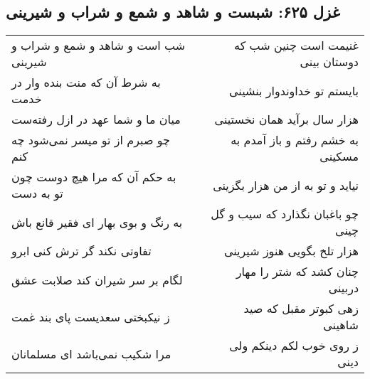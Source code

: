 \begin{center}
\section*{غزل ۶۲۵: شبست و شاهد و شمع و شراب و شیرینی}
\label{sec:625}
\begin{longtable}{l p{0.5cm} r}
شب است و شاهد و شمع و شراب و شیرینی
&&
غنیمت است چنین شب که دوستان بینی
\\
به شرط آن که منت بنده وار در خدمت
&&
بایستم تو خداوندوار بنشینی
\\
میان ما و شما عهد در ازل رفته‌ست
&&
هزار سال برآید همان نخستینی
\\
چو صبرم از تو میسر نمی‌شود چه کنم
&&
به خشم رفتم و باز آمدم به مسکینی
\\
به حکم آن که مرا هیچ دوست چون تو به دست
&&
نیاید و تو به از من هزار بگزینی
\\
به رنگ و بوی بهار ای فقیر قانع باش
&&
چو باغبان نگذارد که سیب و گل چینی
\\
تفاوتی نکند گر ترش کنی ابرو
&&
هزار تلخ بگویی هنوز شیرینی
\\
لگام بر سر شیران کند صلابت عشق
&&
چنان کشد که شتر را مهار دربینی
\\
ز نیکبختی سعدیست پای بند غمت
&&
زهی کبوتر مقبل که صید شاهینی
\\
مرا شکیب نمی‌باشد ای مسلمانان
&&
ز روی خوب لکم دینکم ولی دینی
\\
\end{longtable}
\end{center}
